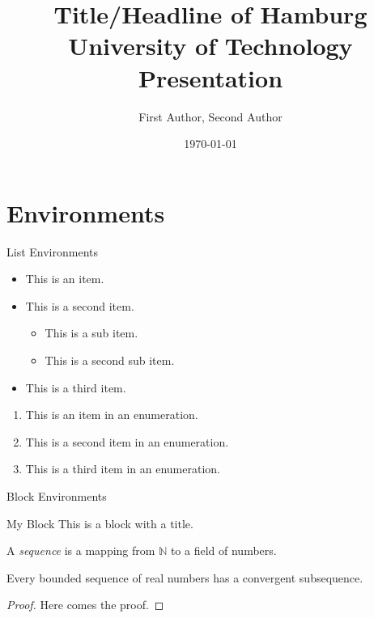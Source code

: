 \documentclass[english,institute=none]{tuhh_presentation}
\title{Title/Headline of Hamburg University of Technology Presentation}
\date{\today} %
\author[Corresponding Author]{First Author, Second Author}
\begin{document}
\titlepage
\agenda

\section{Environments}\label{se:environments}
\begin{frame}{List Environments}
    \begin{minipage}{0.49\textwidth}
        \begin{itemize}
            \item This is an item.
            \item This is a second item.
            \begin{itemize}
                \item This is a sub item.
                \item This is a second sub item.
            \end{itemize}
            \item This is a third item.
        \end{itemize}
    \end{minipage}
    \begin{minipage}{0.49\textwidth}
        \begin{enumerate}
            \item This is an item in an enumeration.
            \item This is a second item in an enumeration.
            \item This is a third item in an enumeration.
        \end{enumerate}
    \end{minipage}
\end{frame}

\begin{frame}{Block Environments}
    \begin{block}{My Block}
      This is a block with a title.
    \end{block}

    \begin{definition}
      A \emph{sequence} is a mapping from $\mathbb{N}$ to a field of numbers.
    \end{definition}

    \begin{theorem}
      Every bounded sequence of real numbers has a convergent subsequence.
    \end{theorem}

    \begin{proof}
      Here comes the proof.
    \end{proof}
\end{frame}
\end{document}
